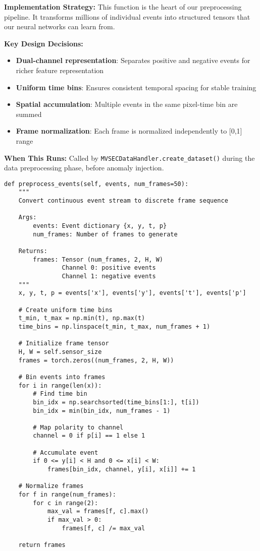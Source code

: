 \documentclass[12pt,a4paper]{article}
\begin{document}
\textbf{Implementation Strategy:} This function is the heart of our preprocessing pipeline. It transforms millions of individual events into structured tensors that our neural networks can learn from.

\textbf{Key Design Decisions:}
\begin{itemize}
    \item \textbf{Dual-channel representation}: Separates positive and negative events for richer feature representation
    \item \textbf{Uniform time bins}: Ensures consistent temporal spacing for stable training
    \item \textbf{Spatial accumulation}: Multiple events in the same pixel-time bin are summed
    \item \textbf{Frame normalization}: Each frame is normalized independently to [0,1] range
\end{itemize}

\textbf{When This Runs:} Called by \texttt{MVSECDataHandler.create\_dataset()} during the data preprocessing phase, before anomaly injection.

\begin{lstlisting}[caption={Temporal Binning Implementation - Converting Events to Neural Network Input}]
def preprocess_events(self, events, num_frames=50):
    """
    Convert continuous event stream to discrete frame sequence
    
    Args:
        events: Event dictionary {x, y, t, p}
        num_frames: Number of frames to generate
    
    Returns:
        frames: Tensor (num_frames, 2, H, W)
                Channel 0: positive events
                Channel 1: negative events
    """
    x, y, t, p = events['x'], events['y'], events['t'], events['p']
    
    # Create uniform time bins
    t_min, t_max = np.min(t), np.max(t)
    time_bins = np.linspace(t_min, t_max, num_frames + 1)
    
    # Initialize frame tensor
    H, W = self.sensor_size
    frames = torch.zeros((num_frames, 2, H, W))
    
    # Bin events into frames
    for i in range(len(x)):
        # Find time bin
        bin_idx = np.searchsorted(time_bins[1:], t[i])
        bin_idx = min(bin_idx, num_frames - 1)
        
        # Map polarity to channel
        channel = 0 if p[i] == 1 else 1
        
        # Accumulate event
        if 0 <= y[i] < H and 0 <= x[i] < W:
            frames[bin_idx, channel, y[i], x[i]] += 1
    
    # Normalize frames
    for f in range(num_frames):
        for c in range(2):
            max_val = frames[f, c].max()
            if max_val > 0:
                frames[f, c] /= max_val
    
    return frames
\end{lstlisting}
\end{document}
